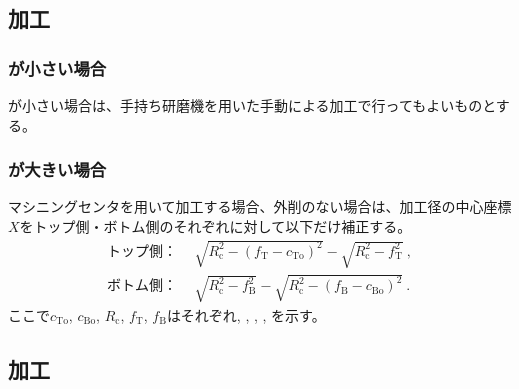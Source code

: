 \subsection{\EndFaceOutCChamfer 加工}

\subsubsection{\EndFaceCChamferLength が小さい場合}
\EndFaceOutCChamferLength が小さい場合は、手持ち研磨機を用いた手動による加工で行ってもよいものとする。

\subsubsection{\EndFaceCChamferLength が大きい場合}
マシニングセンタを用いて加工する場合、外削のない場合は、加工径の中心座標$X$をトップ側・ボトム側のそれぞれに対して以下だけ補正する。
\begin{align*}
  \text{トップ側：}&~~
  \sqrt{R_\mathrm c^2-\left(f_\mathrm T-c_\mathrm{To}\right)^2}-\sqrt{R_\mathrm c^2-f_\mathrm T^2}\ ,\\
  \text{ボトム側：}&~~
  \sqrt{R_\mathrm c^2-f_\mathrm B^2}-\sqrt{R_\mathrm c^2-\left(f_\mathrm B-c_\mathrm{Bo}\right)^2}\ .
\end{align*}
ここで$c_\mathrm{To}$, $c_\mathrm{Bo}$, $R_\mathrm c$, $f_\mathrm T$, $f_\mathrm B$はそれぞれ\TopEndFaceOutCChamferLength, \BottomEndFaceOutCChamferLength, \CenterCurvatureRadius, \TopAlocationLength, \BottomAlocationLength を示す。


\clearpage
\subsection{\EndFaceInCChamfer 加工}

